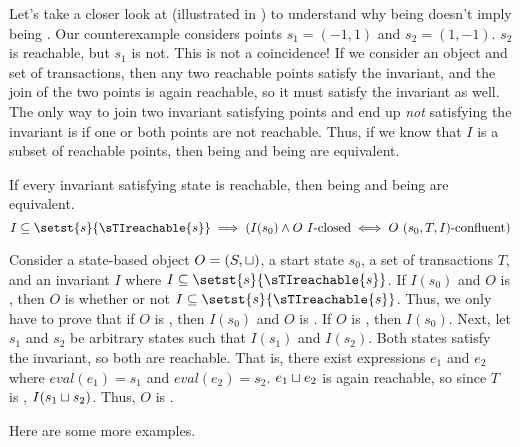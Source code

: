 

Let's take a closer look at  (illustrated in
) to understand why being \sTIconfluent{}
doesn't imply being \Iclosed{}. Our counterexample considers points $s_1 = (-1,
1)$ and $s_2 = (1, -1)$. $s_2$ is reachable, but $s_1$ is not. This is not a
coincidence! If we consider an \sTIconfluent{} object and set of transactions,
then any two reachable points satisfy the invariant, and the join of the two
points is again reachable, so it must satisfy the invariant as well. The only
way to join two invariant satisfying points and end up \emph{not} satisfying
the invariant is if one or both points are not reachable. Thus, if we know that
$I$ is a subset of reachable points, then being \sTIconfluent{} and being
\Iclosed{} are equivalent.

\begin{claim}
  If every invariant satisfying state is reachable, then being \sTIconfluent{}
  and being \Iclosed{} are equivalent.
  \[
    I \subseteq \setst{s}{\sTIreachable{s}} \implies
    (I(s_0) \land \text{$O$ \Iclosed{}} \iff \text{$O$ \sTIconfluent})
  \]
\end{claim}
\begin{elidableproof}
  Consider a state-based object $O = (S, \sqcup)$, a start state $s_0$, a set of
  transactions $T$, and an invariant $I$ where $I \subseteq
  \setst{s}{\sTIreachable{s}}$.
  If $I(s_0)$ and $O$ is \Iclosed{}, then $O$ is \sTIconfluent{} whether or not
  $I \subseteq \setst{s}{\sTIreachable{s}}$. Thus, we only have to prove that
  if $O$ is \sTIconfluent{}, then $I(s_0)$ and $O$ is \Iclosed.
  If $O$ is \sTIconfluent{}, then $I(s_0)$. Next, let $s_1$ and $s_2$ be
  arbitrary states such that $I(s_1)$ and $I(s_2)$. Both states satisfy the
  invariant, so both are reachable. That is, there exist expressions $e_1$ and
  $e_2$ where $eval(e_1) = s_1$  and $eval(e_2) = s_2$. $e_1 \sqcup e_2$ is
  again reachable, so since $T$ is \sTIconfluent{}, $I(s_1 \sqcup s_2)$.  Thus,
  $O$ is \Iclosed.
\end{elidableproof}

Here are some more examples. 

